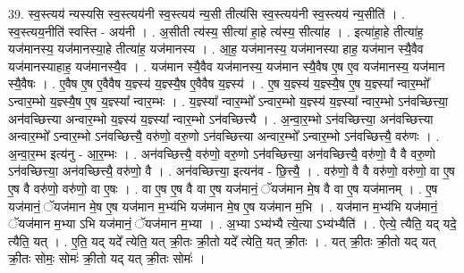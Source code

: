 \documentclass[17pt]{extarticle}
\begin{document}
39. स्व॒स्त्यय॑ न्यस्यसि स्व॒स्त्यय॑नी स्व॒स्त्यय॑ न्य॒सी तीत्य॑सि स्व॒स्त्यय॑नी स्व॒स्त्यय॑ न्य॒सीति॑ । . स्व॒स्त्यय॒नीति॑ स्वस्ति - अय॑नी । . अ॒सीती त्य॑स्य॒ सीत्या॑ हा॒हे त्य॑स्य॒ सीत्या॑ह । . इत्या॑हा॒हे तीत्या॑ह॒ यज॑मानस्य॒ यज॑मानस्या॒हे तीत्या॑ह॒ यज॑मानस्य । . आ॒ह॒ यज॑मानस्य॒ यज॑मानस्या हाह॒ यज॑मान स्यै॒वैव यज॑मानस्याहाह॒ यज॑मानस्यै॒व । . यज॑मान स्यै॒वैव यज॑मानस्य॒ यज॑मान स्यै॒वैष ए॒ष ए॒व यज॑मानस्य॒ यज॑मान स्यै॒वैषः । . ए॒वैष ए॒ष ए॒वैवैष य॒ज्ञ्स्य॑ य॒ज्ञ्स्यै॒ष ए॒वैवैष य॒ज्ञ्स्य॑ । . ए॒ष य॒ज्ञ्स्य॑ य॒ज्ञ्स्यै॒ष ए॒ष य॒ज्ञ्स्या᳚ न्वार॒म्भो᳚ ऽन्वार॒म्भो य॒ज्ञ्स्यै॒ष ए॒ष य॒ज्ञ्स्या᳚ न्वार॒म्भः । . य॒ज्ञ्स्या᳚ न्वार॒म्भो᳚ ऽन्वार॒म्भो य॒ज्ञ्स्य॑ य॒ज्ञ्स्या᳚ न्वार॒म्भो ऽन॑वच्छित्त्या॒ अन॑वच्छित्त्या अन्वार॒म्भो य॒ज्ञ्स्य॑ य॒ज्ञ्स्या᳚ न्वार॒म्भो ऽन॑वच्छित्त्यै । . अ॒न्वा॒र॒म्भो ऽन॑वच्छित्त्या॒ अन॑वच्छित्त्या अन्वार॒म्भो᳚ ऽन्वार॒म्भो ऽन॑वच्छित्त्यै॒ वरु॑णो॒ वरु॒णो ऽन॑वच्छित्त्या अन्वार॒म्भो᳚ ऽन्वार॒म्भो ऽन॑वच्छित्त्यै॒ वरु॑णः । . अ॒न्वा॒र॒म्भ इत्य॑नु - आ॒र॒म्भः । . अन॑वच्छित्त्यै॒ वरु॑णो॒ वरु॒णो ऽन॑वच्छित्त्या॒ अन॑वच्छित्त्यै॒ वरु॑णो॒ वै वै वरु॒णो ऽन॑वच्छित्त्या॒ अन॑वच्छित्त्यै॒ वरु॑णो॒ वै । . अन॑वच्छित्त्या॒ इत्यन॑व - छि॒त्त्यै॒ । . वरु॑णो॒ वै वै वरु॑णो॒ वरु॑णो॒ वा ए॒ष ए॒ष वै वरु॑णो॒ वरु॑णो॒ वा ए॒षः । . वा ए॒ष ए॒ष वै वा ए॒ष यज॑मानं॒ ॅयज॑मान मे॒ष वै वा ए॒ष यज॑मानम् । . ए॒ष यज॑मानं॒ ॅयज॑मान मे॒ष ए॒ष यज॑मान म॒भ्य॑भि यज॑मान मे॒ष ए॒ष यज॑मान म॒भि । . यज॑मान म॒भ्य॑भि यज॑मानं॒ ॅयज॑मान म॒भ्या ऽभि यज॑मानं॒ ॅयज॑मान म॒भ्या । . अ॒भ्या ऽभ्य॑भ्यै त्ये॒त्या ऽभ्य॑भ्यैति॑ । . ऐत्ये॒ त्यैति॒ यद् यदे॒ त्यैति॒ यत् । . ए॒ति॒ यद् यदे᳚ त्येति॒ यत् क्री॒तः क्री॒तो यदे᳚ त्येति॒ यत् क्री॒तः । . यत् क्री॒तः क्री॒तो यद् यत् क्री॒तः सोमः॒ सोमः॑ क्री॒तो यद् यत् क्री॒तः सोमः॑ । \newline
\pagebreak
{}
\end{document}
